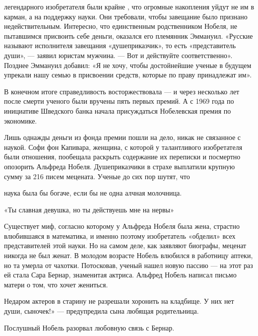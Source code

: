  легендарного изобретателя были крайне , что огромные накопления уйдут не им в карман, а на поддержку науки. Они требовали, чтобы завещание было признано недействительным. Интересно, что единственным родственником Нобеля, не пытавшимся присвоить себе деньги, оказался его племянник Эммануил. «Русские называют исполнителя завещания «душеприказчик», то есть «представитель души», --- заявил юристам мужчина. --- Вот и действуйте соответственно». Позднее Эммануил добавил: «Я не хочу, чтобы достойнейшие ученые в будущем упрекали нашу семью в присвоении средств, которые по праву принадлежат им».

В конечном итоге справедливость восторжествовала --- и через несколько лет после смерти ученого были вручены пять первых премий. А с 1969 года по инициативе Шведского банка начала присуждаться Нобелевская премия по экономике.

Лишь однажды деньги из фонда премии пошли на дело, никак не связанное с наукой. Софи фон Капивара, женщина, с которой у талантливого изобретателя были отношения, пообещала раскрыть содержание их переписки и посмертно опозорить Альфреда Нобеля. Душеприказчики в страхе выплатили крупную сумму за 216 писем мецената. Ученые до сих пор шутят, что

\begin{fancyquotes}
    наука была бы богаче, если бы не одна алчная молочница.
\end{fancyquotes}

«Ты славная девушка, но ты действуешь мне на нервы»

Существует миф, согласно которому у Альфреда Нобеля была жена, страстно влюбившаяся в математика, и именно поэтому изобретатель «обделил» всех представителей этой науки. Но на самом деле, как заявляют биографы, меценат никогда не был женат. В молодом возрасте Нобель влюбился в работницу аптеки, но та умерла от чахотки. Потосковав, ученый нашел новую пассию --- на этот раз ей стала Сара Бернар, знаменитая актриса. Альфред Нобель написал письмо матери о том, что хочет жениться.

\begin{fancyquotes}
    Недаром актеров в старину не разрешали хоронить на кладбище. У них нет души, сыночек!» --- предупредила сына любящая родительница.
\end{fancyquotes}



Послушный Нобель разорвал любовную связь с Бернар.

